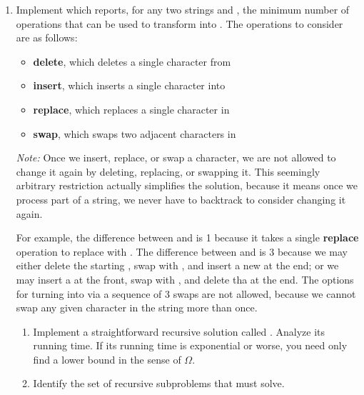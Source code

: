 \documentclass{article}
\begin{document}
\begin{enumerate}

  \newpage
  \item Implement  which reports, for any two strings
     and , the minimum number of operations that can be used
    to transform  into .  The operations to consider are as
    follows:
    \begin{itemize}
    \item \textbf{delete}, which deletes a single character from 
    \item \textbf{insert}, which inserts a single character into 
    \item \textbf{replace}, which replaces a single character in 
    \item \textbf{swap}, which swaps two adjacent characters in 
    \end{itemize}
    \emph{Note:} Once we insert, replace, or swap a character, we are not
    allowed to change it again by deleting, replacing, or swapping it.  This
    seemingly arbitrary restriction actually simplifies the solution, because it
    means once we process part of a string, we never have to backtrack to
    consider changing it again.

    For example, the difference between  and  is 1
    because it takes a single \textbf{replace} operation to replace 
    with .  The difference between  and  is 3
    because we may either delete the starting , swap  with
    , and insert a new  at the end; or we may insert a
     at the front, swap  with , and delete tha
     at the end.  The options for turning  into
     via a sequence of 3 swaps are not allowed, because we cannot
    swap any given character in the string more than once.

    \begin{enumerate}

    \item Implement a straightforward recursive solution called
      .  Analyze its running time.  If its running
      time is exponential or worse, you need only find a lower bound in the
      sense of \(\Omega\).

    \item Identify the set of recursive subproblems that
       must solve.


\end{enumerate}
\end{enumerate}
\end{document}
